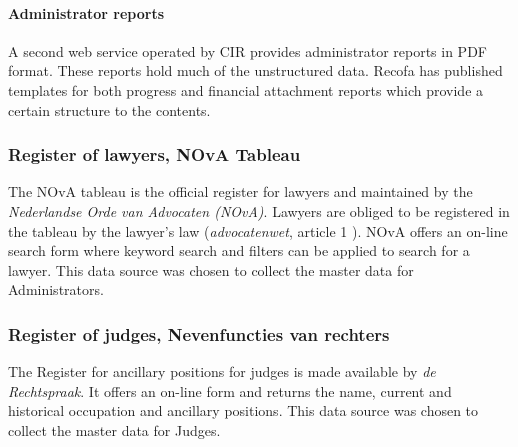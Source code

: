 \paragraph{Administrator reports}
A second web service operated by CIR provides administrator reports in PDF format. These reports hold much of the unstructured data. Recofa has published templates for both progress and financial attachment reports \cite{rechtspraak:3} which provide a certain structure to the contents.

\subsubsection{Register of lawyers, NOvA Tableau}\label{NOvA Tableau}
The NOvA tableau is the official register for lawyers and maintained by the \textit{Nederlandse Orde van Advocaten (NOvA)}\cite{nova:1}. Lawyers are obliged to be registered in the tableau by the lawyer's law (\textit{advocatenwet}, article 1 \cite{law:2}). NOvA offers an on-line search form where keyword search and filters can be applied to search for a lawyer. This data source was chosen to collect the master data for Administrators. 

\subsubsection{Register of judges, Nevenfuncties van rechters}\label{Nevenfuncties Rechters}
The Register for ancillary positions for judges is made available by \textit{de Rechtspraak}\cite{rechtspraak:2}. It offers an on-line form and returns the name, current and historical occupation and ancillary positions. This data source was chosen to collect the master data for Judges.
